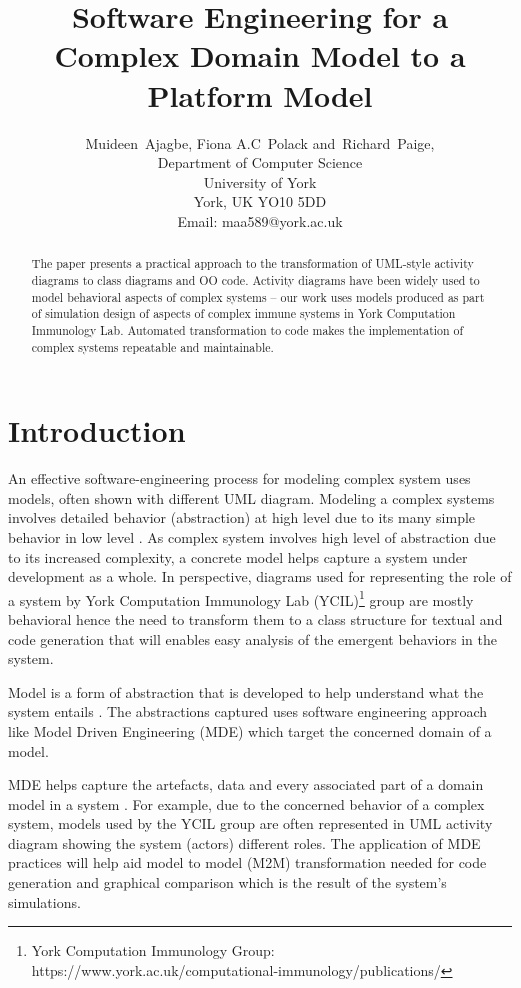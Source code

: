 \documentclass[10pt]{article}
\begin{document}
\title{Software Engineering for a Complex Domain Model to a Platform Model}
\author{Muideen~Ajagbe,
        Fiona A.C~Polack
        and~Richard~Paige,\\
Department of Computer Science\\
University of York\\
York, UK YO10 5DD\\
Email: maa589@york.ac.uk}
\date{\vspace{-5ex}}
\maketitle
\begin{abstract}
The paper presents a practical approach to the transformation of UML-style activity diagrams to class diagrams and OO code. Activity diagrams have been widely used to model behavioral aspects of complex systems – our work uses models produced as part of simulation design of aspects of complex immune systems in York Computation Immunology Lab. Automated transformation to code makes the implementation of complex systems repeatable and maintainable.
\end{abstract}
\section{Introduction}
An effective software-engineering process for modeling complex system uses models, often shown with different UML diagram. Modeling a complex systems involves detailed behavior (abstraction) at high level due to its many simple behavior in low level \cite{Polack08complexsystems}. As complex system involves high level of abstraction due to its increased complexity, a concrete model helps capture a system under development as a whole. In perspective, diagrams used for representing the role of a system by York Computation Immunology Lab (YCIL)\footnote{York Computation Immunology Group: https://www.york.ac.uk/computational-immunology/publications/} group are mostly behavioral hence the need to transform them to a class structure for textual and code generation that will enables easy analysis of the emergent behaviors in the system.

Model is a form of abstraction that is developed to help understand what the system entails \cite{Brambilla:2012:MSE:2432361}. The abstractions captured uses software engineering approach like Model Driven Engineering (MDE) which target the concerned domain of a model. 

MDE helps capture the artefacts, data and every associated part of a domain model in a system \cite{Schmidt:2006:GEI:1115688.1115706}. For example, due to the concerned behavior of a complex system, models used by the YCIL group are often represented in UML activity diagram showing the system (actors) different roles. The application of MDE practices will help aid model to model (M2M) transformation needed for code generation and graphical comparison which is the result of the system's simulations.
\end{document}
